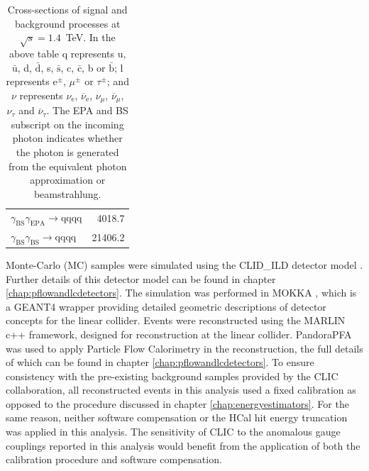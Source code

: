 \begin{table}[h!]
\begin{tabular}{ l r }
$\gamma_{\text{BS}}\gamma_{\text{EPA}} \rightarrow \text{qqqq}$ & 4018.7\\
$\gamma_{\text{BS}}\gamma_{\text{BS}} \rightarrow \text{qqqq}$ & 21406.2\\
\hline
\end{tabular}
\caption[Cross-sections of signal and background processes at $\sqrt{s}=1.4$~TeV]{Cross-sections of signal and background processes at $\sqrt{s}=1.4$~TeV.  In the above table q represents u, $\bar{\text{u}}$, d, $\bar{\text{d}}$, s, $\bar{\text{s}}$, c, $\bar{\text{c}}$, b or $\bar{\text{b}}$;  l represents $\text{e}^{\pm}$, $\mu^{\pm}$ or $\tau^{\pm}$; and $\nu$ represents $\nu_{\text{e}}$, $\overline{\nu}_{\text{e}}$, $\nu_{\mu}$, $\overline{\nu}_{\mu}$, $\nu_{\tau}$ and $\overline{\nu}_{\tau}$.  The EPA and BS subscript on the incoming photon indicates whether the photon is generated from the equivalent photon approximation or beamstrahlung.}
\label{table:crosssection1400GeV}
\end{table}

Monte-Carlo (MC) samples were simulated using the CLID\_ILD detector model \cite{arXiv:1006.3396}.  Further details of this detector model can be found in chapter \ref{chap:pflowandlcdetectors}.  The simulation was performed in MOKKA \cite{MoradeFreitas:2002kj}, which is a GEANT4 \cite{Agostinelli:2002hh} wrapper providing detailed geometric descriptions of detector concepts for the linear collider.  Events were reconstructed using the MARLIN \cite{Gaede:2006pj} c++ framework, designed for reconstruction at the linear collider.  PandoraPFA \cite{arXiv:0907.3577, arXiv:1209.4039} was used to apply Particle Flow Calorimetry in the reconstruction, the full details of which can be found in chapter \ref{chap:pflowandlcdetectors}.  {To ensure consistency with the pre-existing background samples provided by the CLIC collaboration, all reconstructed events in this analysis used a fixed calibration as opposed to the procedure discussed in chapter \ref{chap:energyestimators}.  For the same reason, neither software compensation or the HCal hit energy truncation was applied in this analysis.  The sensitivity of CLIC to the anomalous gauge couplings reported in this analysis would benefit from the application of both the calibration procedure and software compensation.}

